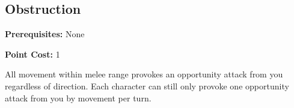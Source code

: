 \subsection{Obstruction}\label{feat:obstruction}

\noindent
\textbf{Prerequisites:} None

\noindent
\textbf{Point Cost:} 1 

All movement within melee range provokes an opportunity attack from you
regardless of direction. Each character can still only provoke one opportunity
attack from you by movement per turn.

